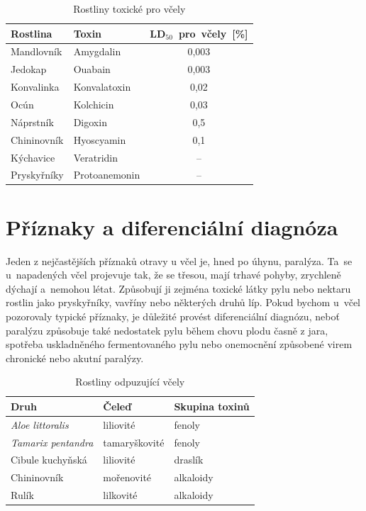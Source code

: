 \documentclass[openany, oneside, a4paper, 12pt, final]{memoir}
\begin{document}
\begin{table}
	\begin{center}
		\begin{tabular}{llS} 
			\toprule
			Rostlina & Toxin & \mbox{LD$_{50}$ pro včely [\%]}\\
			\midrule
			Mandlovník & Amygdalin & 0,003\\
			Jedokap & Ouabain & 0,003\\
			Konvalinka & Konvalatoxin & 0,02\\
			Ocún & Kolchicin & 0,03\\
			Náprstník & Digoxin & 0,5\\
			Chininovník & Hyoscyamin & 0,1\\
			Kýchavice & Veratridin & \mbox{\phantom{ahahahaa}--}\\
			Pryskyřníky & Protoanemonin & \mbox{\phantom{haaahaha}--}\\
			\bottomrule
		\end{tabular}
	\end{center}
	\caption{Rostliny toxické pro včely} 
	\label{table:ld50}
\end{table}



\section{Příznaky a diferenciální diagnóza}
Jeden z nejčastějších příznaků otravy u včel je, hned po úhynu, paralýza. Ta~se u~napadených včel projevuje tak, že se třesou, mají trhavé pohyby, zrychleně dýchají a~nemohou létat. Způsobují ji zejména toxické látky pylu nebo nektaru rostlin jako pryskyřníky, vavříny nebo některých druhů líp. Pokud bychom u~včel pozorovaly typické příznaky, je důležité provést diferenciální diagnózu, neboť paralýzu způsobuje také nedostatek pylu během chovu plodu časně z jara, spotřeba uskladněného fermentovaného pylu nebo onemocnění způsobené virem chronické nebo akutní paralýzy. \cite{BeeWales}

\begin{table}
	\begin{center}
		\begin{tabular}{lll} 
			\toprule
			Druh & Čeleď & Skupina toxinů\\
			\midrule
			\textit{Aloe littoralis} & liliovité & fenoly\\
			\textit{Tamarix pentandra} & tamaryškovité & fenoly\\
			Cibule kuchyňská & liliovité & draslík\\
			Chininovník & mořenovité & alkaloidy\\	
			Rulík & lilkovité & alkaloidy\\		
			\bottomrule
		\end{tabular}
	\end{center}
	\caption{Rostliny odpuzující včely}
	\label{table:exotikaodpuzuje}
\end{table}
\end{document}
